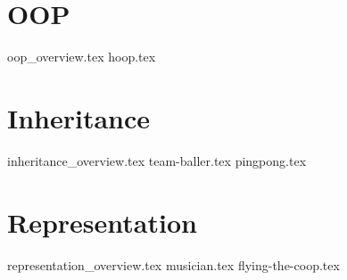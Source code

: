 \documentclass{exam}
\begin{document}
\section{OOP}
\begin{questions}
{oop_overview.tex}
{hoop.tex}
\end{questions}

\newpage
\section{Inheritance}
\begin{questions}
{inheritance_overview.tex}
{team-baller.tex}
{pingpong.tex}
\end{questions}

\newpage
\section{Representation}
\begin{questions}
{representation_overview.tex}
{musician.tex}
{flying-the-coop.tex}
\end{questions}
\end{document}
